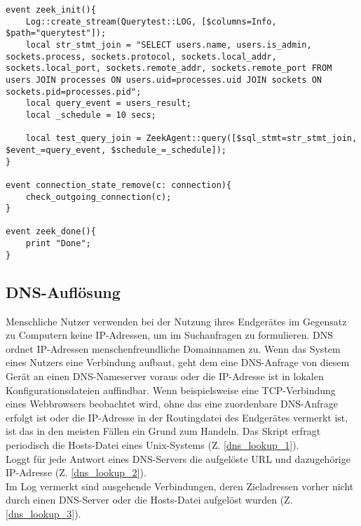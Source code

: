 \begin{lstlisting}[caption={Abfrage und Abgleich der Ports },consecutivenumbers=false,lastline=77,firstnumber=52,numberblanklines=false,linerange={52-55,62-70,76-77}]
event zeek_init(){
	Log::create_stream(Querytest::LOG, [$columns=Info, $path="querytest"]);
    local str_stmt_join = "SELECT users.name, users.is_admin, sockets.process, sockets.protocol, sockets.local_addr, sockets.local_port, sockets.remote_addr, sockets.remote_port FROM users JOIN processes ON users.uid=processes.uid JOIN sockets ON sockets.pid=processes.pid";
    local query_event = users_result;
    local _schedule = 10 secs;
    
    local test_query_join = ZeekAgent::query([$sql_stmt=str_stmt_join, $event_=query_event, $schedule_=_schedule]);
}

event connection_state_remove(c: connection){
    check_outgoing_connection(c);
}

event zeek_done(){
    print "Done";
}
\end{lstlisting}
\subsection{DNS-Auflösung}
Menschliche Nutzer verwenden bei der Nutzung ihres Endgerätes im Gegensatz zu Computern keine IP-Adressen, um im Suchanfragen zu formulieren. DNS ordnet IP-Adressen menschenfreundliche Domainnamen zu. Wenn das System eines Nutzers eine Verbindung aufbaut, geht dem eine DNS-Anfrage von diesem Gerät an einen DNS-Nameserver voraus oder die IP-Adresse ist in lokalen Konfigurationsdateien auffindbar. Wenn beispielsweise eine TCP-Verbindung eines Webbrowsers beobachtet wird, ohne das eine zuordenbare DNS-Anfrage erfolgt ist oder die IP-Adresse in der Routingdatei des Endgerätes vermerkt ist, ist das in den meisten Fällen ein Grund zum Handeln.
Das Skript erfragt periodisch die Hosts-Datei eines Unix-Systems (Z. \ref{dns_lookup_1}).\\
Loggt für jede Antwort eines DNS-Servers die aufgelöste URL und dazugehörige IP-Adresse (Z. \ref{dns_lookup_2}).\\
Im Log vermerkt sind ausgehende Verbindungen, deren Zieladressen vorher nicht durch einen DNS-Server oder die Hosts-Datei aufgelöst wurden (Z. \ref{dns_lookup_3}).
